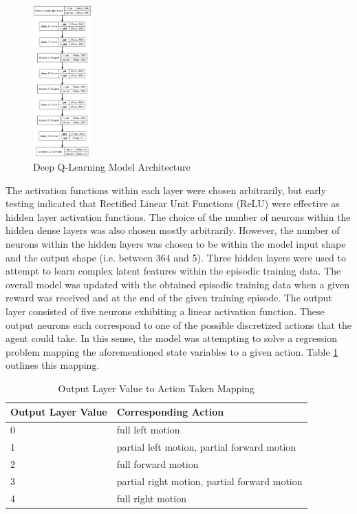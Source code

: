 \documentclass[conference]{IEEEtran}
\begin{document}
\begin{figure}[h]
\centering
\includegraphics[width=0.2\textwidth]{"model.png"}
\caption{Deep Q-Learning Model Architecture}
\label{fig:modelArch}
\end{figure}

The activation functions within each layer were chosen arbitrarily, but early testing indicated that Rectified Linear Unit Functions (ReLU) were effective as hidden layer activation functions. The choice of the number of neurons within the hidden dense layers was also chosen mostly arbitrarily. However, the number of neurons within the hidden layers was chosen to be within the model input shape and the output shape (i.e. between 364 and 5). Three hidden layers were used to attempt to learn complex latent features within the episodic training data. The overall model was updated with the obtained episodic training data when a given reward was received and at the end of the given training episode. The output layer consisted of five neurons exhibiting a linear activation function. These output neurons each correspond to one of the possible discretized actions that the agent could take. In this sense, the model was attempting to solve a regression problem mapping the aforementioned state variables to a given action. Table \ref{tab:ActionTable} outlines this mapping. 

\begin{table}[h!]
\begin{tabular}{|l|l|}
\hline
\textbf{Output Layer Value} & \textbf{Corresponding Action}                \\ \hline
0                           & full left motion                             \\ \hline
1                           & partial left motion, partial forward motion  \\ \hline
2                           & full forward motion                          \\ \hline
3                           & partial right motion, partial forward motion \\ \hline
4                           & full right motion                            \\ \hline
\end{tabular}
\caption{Output Layer Value to Action Taken Mapping}
\label{tab:ActionTable}
\end{table}
\end{document}
